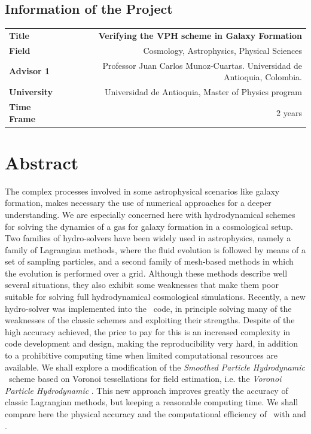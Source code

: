 \documentclass[a4,useAMS,usenatbib,usegraphicx,12pt]{article}
\begin{document}
\subsection*{Information of the Project}
\begin{tabular}{L!{\VRule}R}
\bf Title		& \bf Verifying the VPH scheme in Galaxy Formation\\
\bf Field		& Cosmology, Astrophysics, Physical Sciences \\
\bf Advisor 1	& Professor Juan Carlos Munoz-Cuartas. Universidad de Antioquia, Colombia.\\
\bf University	& Universidad de Antioquia, Master of Physics program \\
\bf Time Frame	& 2 years \\
\end{tabular}
\normalsize

\section{Abstract}

The complex processes involved in some astrophysical scenarios like galaxy 
formation, makes necessary the use of numerical approaches for a deeper 
understanding. We are especially concerned here with hydrodynamical schemes for
solving the dynamics of a gas for galaxy formation in a cosmological setup.
Two families of hydro-solvers have been widely used in astrophysics, namely a
family of Lagrangian methods, where the fluid evolution is followed by means of
a set of sampling particles, and a second family of mesh-based methods in 
which the evolution is performed over a grid. Although these methods describe 
well several situations, they also exhibit some weaknesses that make them poor 
suitable for solving full hydrodynamical cosmological simulations. Recently, a 
new hydro-solver was implemented into the \AREPO\ code, in principle solving 
many of the weaknesses of the classic schemes and exploiting their strengths. 
Despite of the high accuracy achieved, the price to pay for this is an 
increased complexity in code development and design, making the reproducibility 
very hard, in addition to a prohibitive computing time when limited 
computational resources are available. We shall explore a modification of the 
\textit{Smoothed Particle Hydrodynamic} \SPH\ scheme based on Voronoi 
tessellations for field estimation, i.e. the \textit{Voronoi Particle 
Hydrodynamic} \VPH. This new approach improves greatly the accuracy of classic 
Lagrangian methods, but keeping a reasonable computing time. We shall compare 
here the physical accuracy and the computational efficiency of \VPH\ with 
\SPH and \AREPO.
\end{document}
